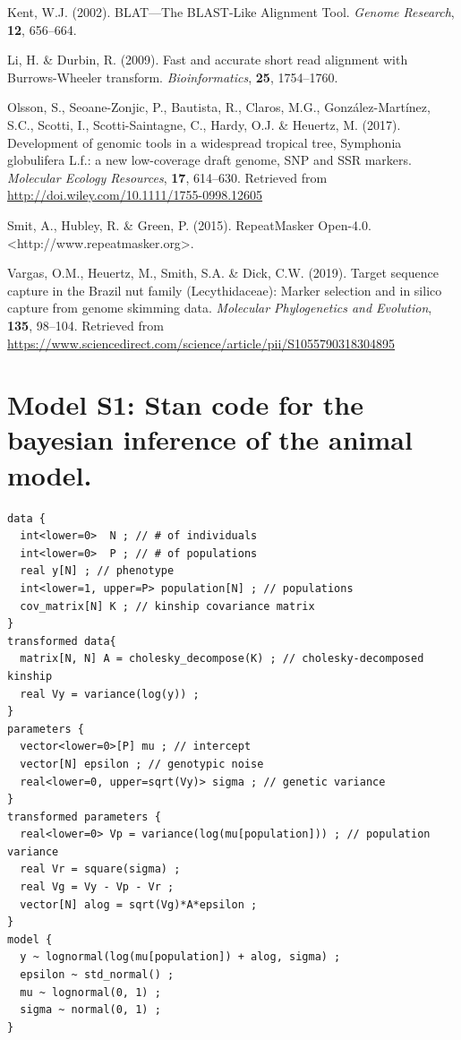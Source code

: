 \documentclass[12pt,]{article}
\begin{document}
\leavevmode\hypertarget{ref-Kent2002}{}%
Kent, W.J. (2002). BLAT---The BLAST-Like Alignment Tool. \emph{Genome Research}, \textbf{12}, 656--664.

\leavevmode\hypertarget{ref-Li2009}{}%
Li, H. \& Durbin, R. (2009). Fast and accurate short read alignment with Burrows-Wheeler transform. \emph{Bioinformatics}, \textbf{25}, 1754--1760.

\leavevmode\hypertarget{ref-Olsson2017}{}%
Olsson, S., Seoane-Zonjic, P., Bautista, R., Claros, M.G., González-Martínez, S.C., Scotti, I., Scotti-Saintagne, C., Hardy, O.J. \& Heuertz, M. (2017). Development of genomic tools in a widespread tropical tree, Symphonia globulifera L.f.: a new low-coverage draft genome, SNP and SSR markers. \emph{Molecular Ecology Resources}, \textbf{17}, 614--630. Retrieved from \url{http://doi.wiley.com/10.1111/1755-0998.12605}

\leavevmode\hypertarget{ref-Smit2015}{}%
Smit, A., Hubley, R. \& Green, P. (2015). RepeatMasker Open-4.0. \textless http://www.repeatmasker.org\textgreater.

\leavevmode\hypertarget{ref-Vargas2019}{}%
Vargas, O.M., Heuertz, M., Smith, S.A. \& Dick, C.W. (2019). Target sequence capture in the Brazil nut family (Lecythidaceae): Marker selection and in silico capture from genome skimming data. \emph{Molecular Phylogenetics and Evolution}, \textbf{135}, 98--104. Retrieved from \url{https://www.sciencedirect.com/science/article/pii/S1055790318304895}

\newpage

\hypertarget{model-s1-stan-code-for-the-bayesian-inference-of-the-animal-model.}{%
\section{Model S1: Stan code for the bayesian inference of the animal model.}\label{model-s1-stan-code-for-the-bayesian-inference-of-the-animal-model.}}

\begin{verbatim}
data {
  int<lower=0>  N ; // # of individuals
  int<lower=0>  P ; // # of populations
  real y[N] ; // phenotype
  int<lower=1, upper=P> population[N] ; // populations
  cov_matrix[N] K ; // kinship covariance matrix
}
transformed data{
  matrix[N, N] A = cholesky_decompose(K) ; // cholesky-decomposed kinship
  real Vy = variance(log(y)) ;
}
parameters {
  vector<lower=0>[P] mu ; // intercept
  vector[N] epsilon ; // genotypic noise
  real<lower=0, upper=sqrt(Vy)> sigma ; // genetic variance
}
transformed parameters {
  real<lower=0> Vp = variance(log(mu[population])) ; // population variance
  real Vr = square(sigma) ;
  real Vg = Vy - Vp - Vr ;
  vector[N] alog = sqrt(Vg)*A*epsilon ;
}
model {
  y ~ lognormal(log(mu[population]) + alog, sigma) ;
  epsilon ~ std_normal() ;
  mu ~ lognormal(0, 1) ;
  sigma ~ normal(0, 1) ;
}
\end{verbatim}
\end{document}
